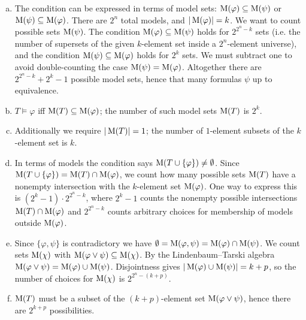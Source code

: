 \begin{problem}
    \begin{solution}
        \begin{enumerate}[(a)]
            \item The condition can be expressed in terms of model sets: $\operatorname{M}(\varphi)\subseteq\operatorname{M}(\psi)$ or $\operatorname{M}(\psi)\subseteq\operatorname{M}(\varphi)$. There are $2^n$ total models, and $|\operatorname{M}(\varphi)|=k$. We want to count possible sets $\operatorname{M}(\psi)$. The condition $\operatorname{M}(\varphi)\subseteq\operatorname{M}(\psi)$ holds for $2^{2^n-k}$ sets (i.e. the number of supersets of the given $k$-element set inside a $2^n$-element universe), and the condition $\operatorname{M}(\psi)\subseteq\operatorname{M}(\varphi)$ holds for $2^k$ sets. We must subtract one to avoid double-counting the case $\operatorname{M}(\psi)=\operatorname{M}(\varphi)$. Altogether there are $2^{2^n-k}+2^k-1$ possible model sets, hence that many formulas $\psi$ up to equivalence.
            \item $T\models\varphi$ iff $\operatorname{M}(T)\subseteq\operatorname{M}(\varphi)$; the number of such model sets $\operatorname{M}(T)$ is $2^k$.
            \item Additionally we require $|\operatorname{M}(T)|=1$; the number of $1$-element subsets of the $k$-element set is $k$.
            \item In terms of models the condition says $\operatorname{M}(T\cup\{\varphi\})\neq\emptyset$. Since $\operatorname{M}(T\cup\{\varphi\})=\operatorname{M}(T)\cap\operatorname{M}(\varphi)$, we count how many possible sets $\operatorname{M}(T)$ have a nonempty intersection with the $k$-element set $\operatorname{M}(\varphi)$. One way to express this is $(2^k-1)\cdot 2^{2^n-k}$, where $2^k-1$ counts the nonempty possible intersections $\operatorname{M}(T)\cap\operatorname{M}(\varphi)$ and $2^{2^n-k}$ counts arbitrary choices for membership of models outside $\operatorname{M}(\varphi)$.
            \item Since $\{\varphi,\psi\}$ is contradictory we have $\emptyset=\operatorname{M}(\varphi,\psi)=\operatorname{M}(\varphi)\cap\operatorname{M}(\psi)$. We count sets $\operatorname{M}(\chi)$ with $\operatorname{M}(\varphi\lor\psi)\subseteq\operatorname{M}(\chi)$. By the Lindenbaum–Tarski algebra $\operatorname{M}(\varphi\lor\psi)=\operatorname{M}(\varphi)\cup\operatorname{M}(\psi)$. Disjointness gives $|\operatorname{M}(\varphi)\cup\operatorname{M}(\psi)|=k+p$, so the number of choices for $\operatorname{M}(\chi)$ is $2^{2^n-(k+p)}$.
            \item $\operatorname{M}(T)$ must be a subset of the $(k+p)$-element set $\operatorname{M}(\varphi\lor\psi)$, hence there are $2^{k+p}$ possibilities.
        \end{enumerate}
                
    \end{solution}
    
\end{problem}


